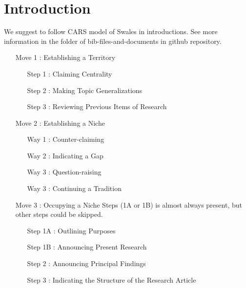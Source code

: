 \section{Introduction}
\label{section-introduction}

We suggest to follow CARS model of Swales \cite{Swales2014Create} in introductions.
See more information in the folder of bib-files-and-documents in github repository.

\begin{enumerate}
	\item[Move 1]: Establishing a Territory
	\begin{enumerate}
		\item[Step 1]: Claiming Centrality
		\item[Step 2]: Making Topic Generalizations
		\item[Step 3]: Reviewing Previous Items of Research

	\end{enumerate}

	\item[Move 2]: Establishing a Niche
	\begin{enumerate}
		\item[Way 1]: Counter-claiming
		\item[Way 2]: Indicating a Gap
		\item[Way 3]: Question-raising
		\item[Way 3]: Continuing a Tradition


	\end{enumerate}
	
	\item[Move 3]:  Occupying a Niche
	 Steps (1A or 1B) is almost always present, but other steps could be skipped.

	\begin{enumerate}
		\item[Step 1A]: Outlining Purposes
		\item[Step 1B]: Announcing Present Research
		\item[Step 2]: Announcing Principal Findings
		\item[Step 3]: Indicating the Structure of the Research Article

	\end{enumerate}

\end{enumerate}

